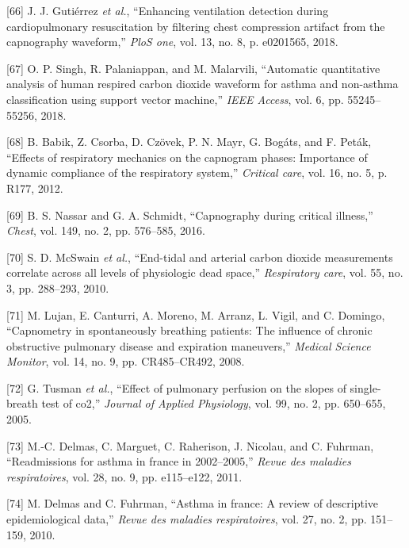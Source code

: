 \documentclass[12pt,]{article}
\begin{document}
\leavevmode\hypertarget{ref-gutierrez2018enhancing}{}%
{[}66{]} J. J. Gutiérrez \emph{et al.}, ``Enhancing ventilation
detection during cardiopulmonary resuscitation by filtering chest
compression artifact from the capnography waveform,'' \emph{PloS one},
vol. 13, no. 8, p. e0201565, 2018.

\leavevmode\hypertarget{ref-singh2018automatic}{}%
{[}67{]} O. P. Singh, R. Palaniappan, and M. Malarvili, ``Automatic
quantitative analysis of human respired carbon dioxide waveform for
asthma and non-asthma classification using support vector machine,''
\emph{IEEE Access}, vol. 6, pp. 55245--55256, 2018.

\leavevmode\hypertarget{ref-babik2012effects}{}%
{[}68{]} B. Babik, Z. Csorba, D. Czövek, P. N. Mayr, G. Bogáts, and F.
Peták, ``Effects of respiratory mechanics on the capnogram phases:
Importance of dynamic compliance of the respiratory system,''
\emph{Critical care}, vol. 16, no. 5, p. R177, 2012.

\leavevmode\hypertarget{ref-nassar2016capnography}{}%
{[}69{]} B. S. Nassar and G. A. Schmidt, ``Capnography during critical
illness,'' \emph{Chest}, vol. 149, no. 2, pp. 576--585, 2016.

\leavevmode\hypertarget{ref-mcswain2010end}{}%
{[}70{]} S. D. McSwain \emph{et al.}, ``End-tidal and arterial carbon
dioxide measurements correlate across all levels of physiologic dead
space,'' \emph{Respiratory care}, vol. 55, no. 3, pp. 288--293, 2010.

\leavevmode\hypertarget{ref-lujan2008capnometry}{}%
{[}71{]} M. Lujan, E. Canturri, A. Moreno, M. Arranz, L. Vigil, and C.
Domingo, ``Capnometry in spontaneously breathing patients: The influence
of chronic obstructive pulmonary disease and expiration maneuvers,''
\emph{Medical Science Monitor}, vol. 14, no. 9, pp. CR485--CR492, 2008.

\leavevmode\hypertarget{ref-tusman2005effect}{}%
{[}72{]} G. Tusman \emph{et al.}, ``Effect of pulmonary perfusion on the
slopes of single-breath test of co2,'' \emph{Journal of Applied
Physiology}, vol. 99, no. 2, pp. 650--655, 2005.

\leavevmode\hypertarget{ref-delmas2011readmissions}{}%
{[}73{]} M.-C. Delmas, C. Marguet, C. Raherison, J. Nicolau, and C.
Fuhrman, ``Readmissions for asthma in france in 2002--2005,''
\emph{Revue des maladies respiratoires}, vol. 28, no. 9, pp. e115--e122,
2011.

\leavevmode\hypertarget{ref-delmas2010asthma}{}%
{[}74{]} M. Delmas and C. Fuhrman, ``Asthma in france: A review of
descriptive epidemiological data,'' \emph{Revue des maladies
respiratoires}, vol. 27, no. 2, pp. 151--159, 2010.
\end{document}
